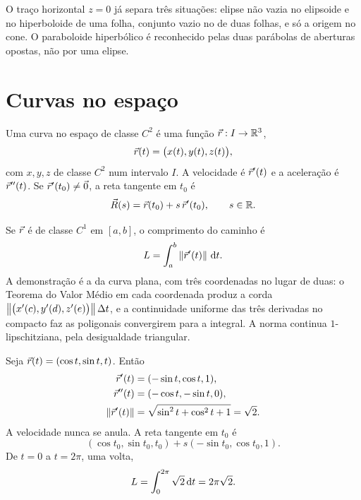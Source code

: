 \documentclass[11pt,a4paper]{article}
\begin{document}
\begin{intuicao}
O traço horizontal \(z=0\) já separa três situações: elipse não vazia no elipsoide e no hiperboloide de uma folha, conjunto vazio no de duas folhas, e só a origem no cone. O paraboloide hiperbólico é reconhecido pelas duas parábolas de aberturas opostas, não por uma elipse.
\end{intuicao}

\section{Curvas no espaço}

\begin{definicao}
Uma curva no espaço de classe \(C^2\) é uma função \(\vec{r}:I\to\mathbb{R}^3\),
\[
\vec{r}(t)=\bigl(x(t),y(t),z(t)\bigr),
\]
com \(x,y,z\) de classe \(C^2\) num intervalo \(I\). A velocidade é \(\vec{r}'(t)\) e a aceleração é \(\vec{r}''(t)\). Se \(\vec{r}'(t_{0})\neq\vec{0}\), a reta tangente em \(t_{0}\) é
\[
\vec{R}(s)=\vec{r}(t_{0})+s\,\vec{r}'(t_{0}),\qquad s\in\mathbb{R}.
\]
\end{definicao}

\begin{teorema}[Comprimento]
Se \(\vec{r}\) é de classe \(C^1\) em \([a,b]\), o comprimento do caminho é
\[
L=\int_{a}^{b}\left\lVert \vec{r}'(t) \right\rVert\,\mathrm{d} t.
\]
A demonstração é a da curva plana, com três coordenadas no lugar de duas: o Teorema do Valor Médio em cada coordenada produz a corda \(\left\lVert \bigl(x'(c),y'(d),z'(e)\bigr) \right\rVert\Delta t\), e a continuidade uniforme das três derivadas no compacto faz as poligonais convergirem para a integral. A norma continua \(1\)-lipschitziana, pela desigualdade triangular.
\end{teorema}

\begin{exemplo}
Seja \(\vec{r}(t)=(\cos t,\sin t,t)\). Então
\begin{align*}
\vec{r}'(t)&=(-\sin t,\cos t,1),\\
\vec{r}''(t)&=(-\cos t,-\sin t,0),\\
\left\lVert \vec{r}'(t) \right\rVert
&=\sqrt{\sin^{2}t+\cos^{2}t+1}
=\sqrt{2}.
\end{align*}
A velocidade nunca se anula. A reta tangente em \(t_{0}\) é
\[
(\cos t_{0},\sin t_{0},t_{0})+s(-\sin t_{0},\cos t_{0},1).
\]
De \(t=0\) a \(t=2\pi\), uma volta,
\[
L=\int_{0}^{2\pi}\sqrt{2}\,\mathrm{d} t=2\pi\sqrt{2}.
\]
\end{exemplo}

\end{document}

